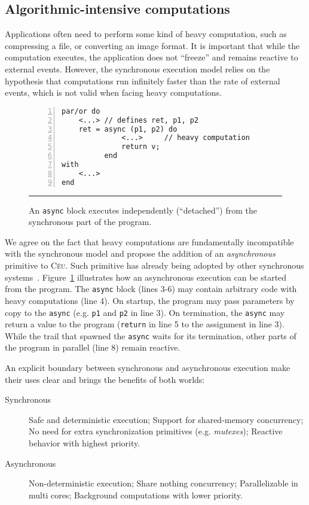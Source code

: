 \documentclass[pdftex,12pt,a4paper]{article}
\newcommand{\CEU}{\textsc{C\'{e}u}\xspace}
\newcommand{\code}[1] {{\small{\texttt{#1}}}}
\begin{document}
\subsection{Algorithmic-intensive computations}

Applications often need to perform some kind of heavy computation, such as 
compressing a file, or converting an image format.
It is important that while the computation executes, the application does not 
``freeze'' and remains reactive to external events.
%
However, the synchronous execution model relies on the hypothesis that 
computations run infinitely faster than the rate of external events, which is 
not valid when facing heavy computations.

\begin{figure}[t]
\begin{lstlisting}[numbers=left,xleftmargin=3em]
par/or do
    <...> // defines ret, p1, p2
    ret = async (p1, p2) do
              <...>     // heavy computation
              return v;
          end
with
    <...>
end
\end{lstlisting}
\rule{13.8cm}{0.37pt}
\caption{
    An \code{async} block executes independently (``detached'') from the 
    synchronous part of the program.
    \label{lst.async}
}
\end{figure}

We agree on the fact that heavy computations are fundamentally incompatible 
with the synchronous model and propose the addition of an \emph{asynchronous} 
primitive to \CEU.
Such primitive has already being adopted by other synchronous 
systems~\cite{esterel.primer,frp.elm}.
%
Figure~\ref{lst.async} illustrates how an asynchronous execution can be started 
from the program.
The \code{async} block (lines 3-6) may contain arbitrary code with heavy 
computations (line 4).
On startup, the program may pass parameters by copy to the \code{async} (e.g.  
\code{p1} and \code{p2} in line 3).
On termination, the \code{async} may return a value to the program 
(\code{return} in line 5 to the assignment in line 3).
%
While the trail that spawned the \code{async} waits for its termination, other 
parts of the program in parallel (line 8) remain reactive.

An explicit boundary between synchronous and asynchronous execution make their 
uses clear and brings the benefits of both worlds:

\begin{description}
\item[Synchronous]
    Safe and deterministic execution;
    Support for shared-memory concurrency;
    No need for extra synchronization primitives (e.g. \emph{mutexes});
    Reactive behavior with highest priority.

\item[Asynchronous]
    Non-deterministic execution;
    Share nothing concurrency;
    Parallelizable in multi cores;
    Background computations with lower priority.
\end{description}
\end{document}
